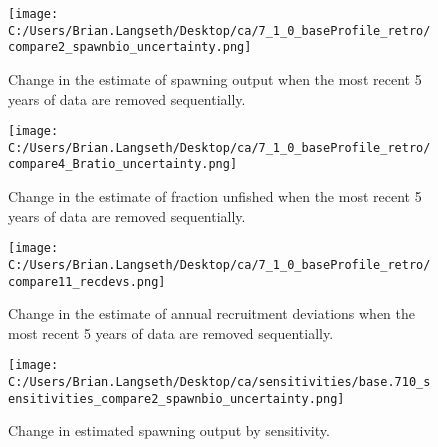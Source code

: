 \documentclass[11pt,
  english,
  letterpaper,
]{article}
\begin{document}
\tagmcend\tagstructend


\begin{figure}
\centering
\texttt{[image: C:/Users/Brian.Langseth/Desktop/ca/7\_1\_0\_baseProfile\_retro/compare2\_spawnbio\_uncertainty.png]}
\caption{Change in the estimate of spawning output when the most recent 5 years of data are removed sequentially.\label{fig:retro-ssb}}
\end{figure}

\tagmcend\tagstructend


\begin{figure}
\centering
\texttt{[image: C:/Users/Brian.Langseth/Desktop/ca/7\_1\_0\_baseProfile\_retro/compare4\_Bratio\_uncertainty.png]}
\caption{Change in the estimate of fraction unfished when the most recent 5 years of data are removed sequentially.\label{fig:retro-depl}}
\end{figure}

\tagmcend\tagstructend


\begin{figure}
\centering
\texttt{[image: C:/Users/Brian.Langseth/Desktop/ca/7\_1\_0\_baseProfile\_retro/compare11\_recdevs.png]}
\caption{Change in the estimate of annual recruitment deviations when the most recent 5 years of data are removed sequentially.\label{fig:retro-recdevs}}
\end{figure}

\tagmcend\tagstructend


\begin{figure}
\centering
\texttt{[image: C:/Users/Brian.Langseth/Desktop/ca/sensitivities/base.710\_sensitivities\_compare2\_spawnbio\_uncertainty.png]}
\caption{Change in estimated spawning output by sensitivity.\label{fig:sens-ssb}}
\end{figure}
\end{document}

